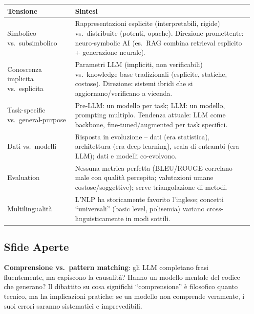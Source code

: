 \documentclass[12pt,a4paper]{article}
\begin{document}
\begin{resultbox}
\begin{center}
\small
\begin{tabular}{L{5.7cm}L{7.6cm}}
\toprule
\textbf{Tensione} & \textbf{Sintesi} \\
\midrule
Simbolico vs.\ subsimbolico & Rappresentazioni esplicite (interpretabili, rigide) vs.\ distribuite (potenti, opache). Direzione promettente: neuro-symbolic AI (es.\ RAG combina retrieval esplicito + generazione neurale). \\
Conoscenza implicita vs.\ esplicita & Parametri LLM (impliciti, non verificabili) vs.\ knowledge base tradizionali (esplicite, statiche, costose). Direzione: sistemi ibridi che si aggiornano/verificano a vicenda. \\
Task-specific vs.\ general-purpose & Pre-LLM: un modello per task; LLM: un modello, prompting multiplo. Tendenza attuale: LLM come backbone, fine-tuned/augmented per task specifici. \\
Dati vs.\ modelli & Risposta in evoluzione -- dati (era statistica), architettura (era deep learning), scala di entrambi (era LLM); dati e modelli co-evolvono. \\
Evaluation & Nessuna metrica perfetta (BLEU/ROUGE correlano male con qualit\`a percepita; valutazioni umane costose/soggettive); serve triangolazione di metodi. \\
Multilingualit\`a & L'NLP ha storicamente favorito l'inglese; concetti ``universali'' (basic level, polisemia) variano cross-linguisticamente in modi sottili. \\
\bottomrule
\end{tabular}
\end{center}
\end{resultbox}

\subsection{Sfide Aperte}

\begin{quizbox}
\textbf{Comprensione vs.\ pattern matching}: gli LLM completano frasi fluentemente, ma capiscono la causalit\`a? Hanno un modello mentale del codice che generano? Il dibattito su cosa significhi ``comprensione'' \`e filosofico quanto tecnico, ma ha implicazioni pratiche: se un modello non comprende veramente, i suoi errori saranno sistematici e imprevedibili.
\end{quizbox}
\end{document}
